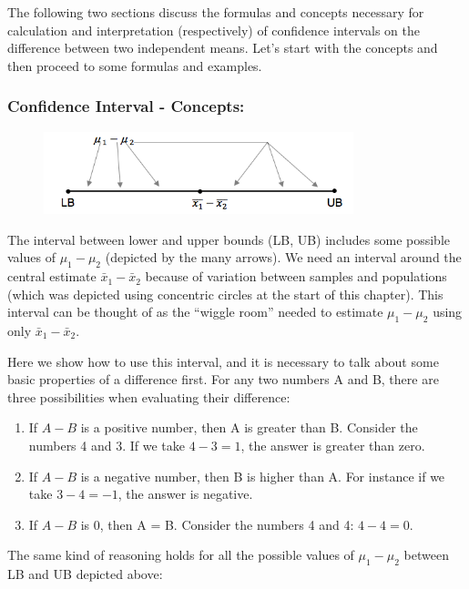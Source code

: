 \documentclass[11pt, chapterprefix=true]{scrbook}\usepackage[]{graphicx}\usepackage[]{color}
\begin{document}
The following two sections discuss the formulas and concepts necessary for calculation and interpretation (respectively) of confidence intervals on the difference between two independent means. Let’s start with the concepts and then proceed to some formulas and examples.

\subsubsection{Confidence Interval - Concepts:}

\begin{figure}[ht]
\centering
\includegraphics[width=9cm]{chapters/Chapter_12/ext_figure/2sample.png} %
\end{figure}

The interval between lower and upper bounds (LB, UB) includes some possible values of $\mu_1 - \mu_2$  (depicted by the many arrows). We need an interval around the central estimate $\bar{x}_1 - \bar{x}_2$ because of variation between samples and populations (which was depicted using concentric circles at the start of this chapter). This interval can be thought of as the ``wiggle room'' needed to estimate $\mu_1 - \mu_2$ using only $\bar{x}_1 - \bar{x}_2$.

Here we show how to use this interval, and it is necessary to talk about some basic properties of a difference first.  For any two numbers A and B, there are three possibilities when evaluating their difference:

\begin{enumerate}
  \item If $A - B$ is a positive number, then A is greater than B. Consider the numbers 4 and 3. If we take $4 - 3 = 1$, the answer is greater than zero.

  \item If $A - B$ is a negative number, then B is higher than A.  For instance if we take  $3 - 4 = -1$, the answer is negative.

  \item If $A - B$ is 0, then A = B. Consider the numbers 4 and 4: $4 - 4 = 0$.
\end{enumerate}

The same kind of reasoning holds for all the possible values of $\mu_1 - \mu_2$ between LB and UB depicted above:
\end{document}
